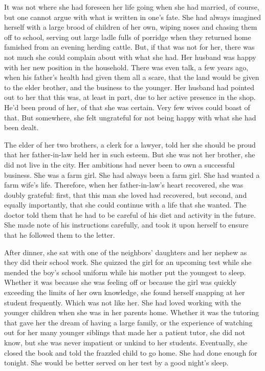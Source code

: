 \documentclass{article}
\begin{document}
It was not where she had foreseen her life going when she had married, of course, but one cannot argue with what is written in one's fate. She had always imagined herself with a large brood of children of her own, wiping noses and chasing them off to school, serving out large ladle fulls of porridge when they returned home famished from an evening herding cattle. But, if that was not for her, there was not much she could complain about with what she had. Her husband was happy with her new position in the household. There was even talk, a few years ago, when his father's health had given them all a scare, that the land would be given to the elder brother, and the business to the younger. Her husband had pointed out to her that this was, at least in part, due to her active presence in the shop. He'd been proud of her, of that she was certain. Very few wives could boast of that. But somewhere, she felt ungrateful for not being happy with what she had been dealt.

The elder of her two brothers, a clerk for a lawyer, told her she should be proud that her father-in-law held her in such esteem. But she was not her brother, she did not live in the city. Her ambitions had never been to own a successful business. She was a farm girl. She had always been a farm girl. She had wanted a farm wife's life. Therefore, when her father-in-law's heart recovered, she was doubly grateful: first, that this man she loved had recovered, but second, and equally importantly, that she could continue with a life that she wanted. The doctor told them that he had to be careful of his diet and activity in the future. She made note of his instructions carefully, and took it upon herself to ensure that he followed them to the letter.

After dinner, she sat with one of the neighbors' daughters and her nephew as they did their school work. She quizzed the girl for an upcoming test while she mended the boy's school uniform while his mother put the youngest to sleep. Whether it was because she was feeling off or because the girl was quickly exceeding the limits of her own knowledge, she found herself snapping at her student frequently. Which was not like her. She had loved working with the younger children when she was in her parents home. Whether it was the tutoring that gave her the dream of having a large family, or the experience of watching out for her many younger siblings that made her a patient tutor, she did not know, but she was never impatient or unkind to her students. Eventually, she closed the book and told the frazzled child to go home. She had done enough for tonight. She would be better served on her test by a good night's sleep.
\end{document}
